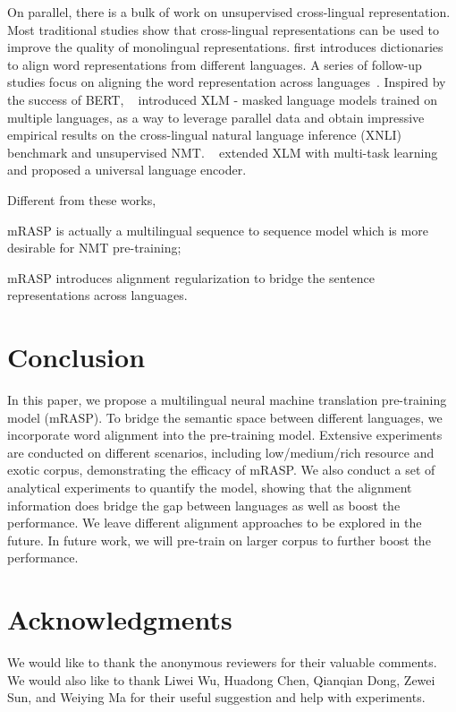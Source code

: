 \documentclass[11pt,a4paper]{article}
\newcommand{\method}{mRASP\xspace}
\begin{document}
On parallel, there is a bulk of work on unsupervised cross-lingual representation.  
Most traditional studies show that cross-lingual
representations can be used to improve the quality of monolingual representations. 
\citet{mikolov2013exploiting} first introduces dictionaries to align
word representations from different languages. 
A series of follow-up studies focus on aligning the word representation across languages~\cite{xing2015normalized,ammar2016massively,smith2017offline,conneau2017word}. 
Inspired by the success of BERT, ~\citet{DBLP:conf/nips/ConneauL19} introduced XLM - masked language models trained on multiple languages, as a way to leverage parallel data and obtain impressive empirical results on the cross-lingual natural language inference
(XNLI) benchmark and unsupervised NMT\cite{DBLP:conf/acl/SennrichHB16,DBLP:conf/iclr/LampleCDR18,DBLP:journals/corr/abs-2002-02955}. 
~\citet{huang2019unicoder} extended XLM with multi-task learning and proposed a universal language encoder. 

Different from these works,  
\begin{inparaenum}[\it a)]
    \item \method is actually a multilingual sequence to sequence model which is more desirable for  NMT pre-training;
    \item \method  introduces alignment regularization to bridge the sentence representations across languages.  
\end{inparaenum} 
\section{Conclusion}
\label{sec:conclusion}
In this paper, we propose a multilingual neural machine translation pre-training model (\method). To bridge the semantic space between different languages, we incorporate word alignment into the pre-training model. Extensive experiments are conducted on different scenarios, including low/medium/rich resource and exotic corpus, demonstrating the efficacy of \method. We also conduct a set of analytical experiments to quantify the model, showing that the alignment information does bridge the gap between languages as well as boost the performance. We leave different alignment approaches to be explored in the future. In future work, we will pre-train on larger corpus to further boost the performance. 
\section*{Acknowledgments}
We would like to thank the anonymous reviewers for their valuable comments.
We would also like to thank Liwei Wu, Huadong Chen, Qianqian Dong, Zewei Sun, and Weiying Ma for their useful suggestion and help with experiments.
\end{document}
